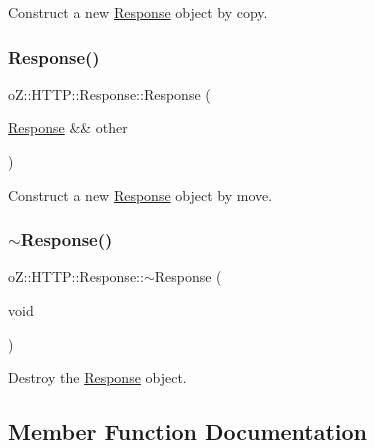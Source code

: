 Construct a new \mbox{\hyperlink{classo_z_1_1_h_t_t_p_1_1_response}{Response}} object by copy. 

\mbox{\label{classo_z_1_1_h_t_t_p_1_1_response_a3a709877eff1de8e3f0695421a616a5f}} 
\subsubsection{\texorpdfstring{Response()}{Response()}\hspace{0.1cm}{\footnotesize\ttfamily [3/3]}}
{\footnotesize\ttfamily o\+Z\+::\+H\+T\+T\+P\+::\+Response\+::\+Response (\begin{DoxyParamCaption}\item[{\mbox{\hyperlink{classo_z_1_1_h_t_t_p_1_1_response}{Response}} \&\&}]{other }\end{DoxyParamCaption})\hspace{0.3cm}{\ttfamily [default]}}



Construct a new \mbox{\hyperlink{classo_z_1_1_h_t_t_p_1_1_response}{Response}} object by move. 

\mbox{\label{classo_z_1_1_h_t_t_p_1_1_response_aa88d97261700d9a915fb8fdcc7ab42f5}} 
\subsubsection{\texorpdfstring{$\sim$Response()}{~Response()}}
{\footnotesize\ttfamily o\+Z\+::\+H\+T\+T\+P\+::\+Response\+::$\sim$\+Response (\begin{DoxyParamCaption}\item[{void}]{ }\end{DoxyParamCaption})\hspace{0.3cm}{\ttfamily [default]}}



Destroy the \mbox{\hyperlink{classo_z_1_1_h_t_t_p_1_1_response}{Response}} object. 



\subsection{Member Function Documentation}
\mbox{\label{classo_z_1_1_h_t_t_p_1_1_response_a7f32dbfaac05fb9eea48e33933156e55}} 

